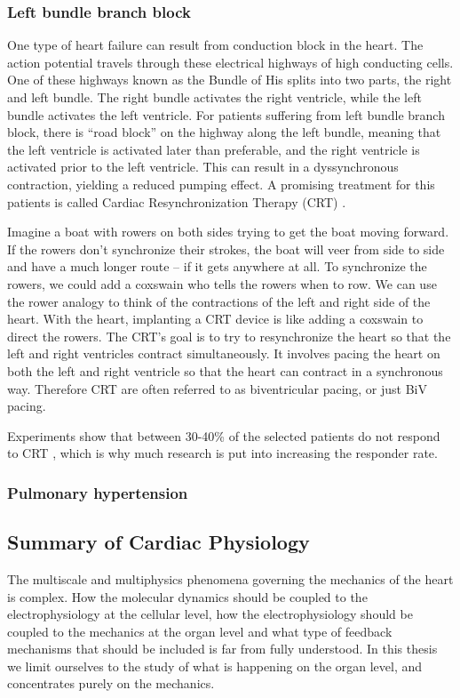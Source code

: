 \subsubsection{Left bundle branch block}

One type of heart failure can result from conduction block in the
heart. The action potential travels through these electrical highways
of high conducting cells. One of these highways known as the Bundle of
His splits into two parts, the right and left bundle. The right bundle
activates the right ventricle, while the left bundle activates the
left ventricle. For patients suffering from left bundle branch block,
there is ``road block'' on the highway along the left bundle, meaning
that the left ventricle is activated later than preferable, and the
right ventricle is activated prior to the left
ventricle. This can result in a dyssynchronous contraction, yielding a
reduced pumping effect. A promising treatment for this patients is
called Cardiac Resynchronization Therapy (CRT) \cite{cleland2005effect}.

Imagine a boat with rowers on both sides trying to get the boat moving
forward. If the rowers don’t synchronize their strokes, the boat will
veer from side to side and have a much longer route – if it gets
anywhere at all. To synchronize the rowers, we could add a coxswain
who tells the rowers when to row. We can use the rower analogy to
think of the contractions of the left and right side of the
heart. With the heart, implanting a CRT device is like adding a
coxswain to direct the rowers. The CRT’s goal is to try to
resynchronize the heart so that the left and right ventricles contract
simultaneously. It involves pacing the heart on both the left and
right ventricle so that the heart can contract in a synchronous
way. Therefore CRT are often referred to as biventricular pacing, or
just BiV pacing.

Experiments show that between 30-40\% of the selected patients do
not respond to CRT \cite{daubert20122012}, which is why much research
is put into increasing the responder rate. 



\subsubsection{Pulmonary hypertension}


\subsection{Summary of Cardiac Physiology}
The multiscale and multiphysics phenomena governing the mechanics of
the heart is complex. How the molecular dynamics should be coupled to
the electrophysiology at the cellular level, how the electrophysiology
should be coupled to the mechanics at the organ level and what type of
feedback mechanisms that should be included is far from fully
understood. In this thesis we limit ourselves to the study of what is
happening on the organ level, and concentrates purely on the
mechanics. 


